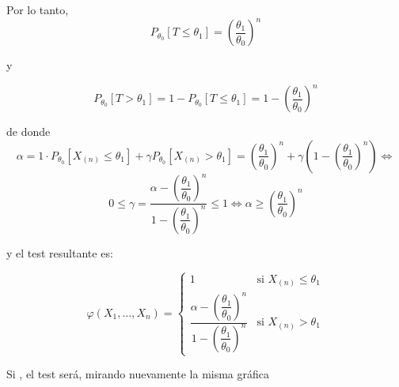 \documentclass[12pt]{article}
\begin{document}
\begin{ejercicio}[1.75 puntos]
        Por lo tanto, $$P_{\theta_0}[T \leq \theta_1] = \left( \dfrac{\theta_1}{\theta_0} \right)^{n}$$

        y

        $$P_{\theta_0}[T > \theta_1] = 1 - P_{\theta_0}[T \leq \theta_1] = 1 - \left( \dfrac{\theta_1}{\theta_0} \right)^{n}$$

        de donde
        $$\alpha = 1 \cdot P_{\theta_0}[X_{(n)} \leq \theta_1] + 
        \gamma P_{\theta_0}[X_{(n)} > \theta_1] = \left( \dfrac{\theta_1}{\theta_0} \right)^{n} + \gamma \left( 1 - \left( \dfrac{\theta_1}{\theta_0} \right)^{n} \right) \iff $$
        $$0 \leq \gamma = \dfrac{\alpha - \left( \dfrac{\theta_1}{\theta_0} \right)^{n}}{1 - \left( \dfrac{\theta_1}{\theta_0} \right)^{n}} \leq 1 \iff \alpha \geq \left( \dfrac{\theta_1}{\theta_0} \right)^{n}$$

        y el test resultante es:

        $$\varphi(X_1, \ldots, X_n) = 
            \begin{cases}
                1 &\text{si } X_{(n)} \leq \theta_1 \\
                \dfrac{\alpha - \left( \dfrac{\theta_1}{\theta_0} \right)^{n}}{1 - \left( \dfrac{\theta_1}{\theta_0} \right)^{n}} &\text{si } X_{(n)} > \theta_1
            \end{cases}$$      

        Si , el test será, mirando nuevamente la misma gráfica

        \begin{figure}[H]
            \centering
\end{figure}
\end{ejercicio}
\end{document}
